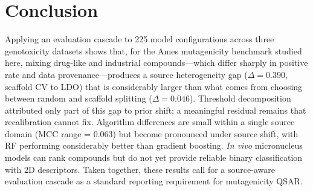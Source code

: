 \section{Conclusion}

Applying an evaluation cascade to 225 model configurations across three genotoxicity 
datasets shows that, for the Ames mutagenicity benchmark studied here, mixing drug-like and 
industrial compounds---which differ sharply in positive rate and data provenance---produces 
a source heterogeneity gap ($\Delta = 0.390$, scaffold CV to LDO) that is considerably 
larger than what comes from choosing between random and scaffold splitting ($\Delta = 0.046$). 
Threshold decomposition attributed only part of this gap to prior shift; a meaningful 
residual remains that recalibration cannot fix. Algorithm differences are small within a 
single source domain (MCC range = 0.063) but become pronounced under source shift, with RF 
performing considerably better than gradient boosting. \textit{In vivo} micronucleus models can rank 
compounds but do not yet provide reliable binary classification with 2D descriptors. Taken 
together, these results call for a source-aware evaluation cascade as a standard reporting 
requirement for mutagenicity QSAR.
